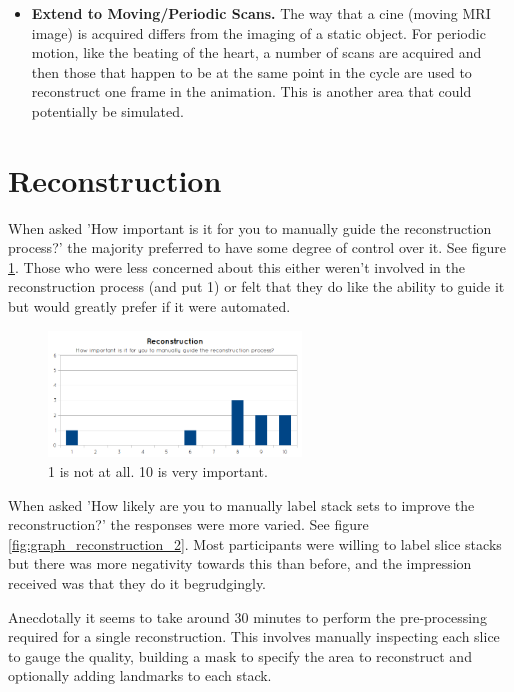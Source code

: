 \begin{itemize}
  \item \textbf{Extend to Moving/Periodic Scans.} The way that a cine (moving MRI image) is acquired differs from the imaging of a static object. For periodic motion, like the beating of the heart, a number of scans are acquired and then those that happen to be at the same point in the cycle are used to reconstruct one frame in the animation. This is another area that could potentially be simulated.
\end{itemize}


\newpage
\section{Reconstruction}\label{results:reconstruction}
When asked 'How important is it for you to manually guide the reconstruction process?' the majority preferred to have some degree of control over it. See figure \ref{fig:graph_reconstruction_1}. Those who were less concerned about this either weren't involved in the reconstruction process (and put 1) or felt that they do like the ability to guide it but would greatly prefer if it were automated.

\begin{figure}[h]
    \centering
  \includegraphics[width=0.6\textwidth]{images/evaluation/graph_reconstruction_1.png}
    \caption{1 is not at all. 10 is very important.}\label{fig:graph_reconstruction_1}
\end{figure}

When asked 'How likely are you to manually label stack sets to improve the reconstruction?' the responses were more varied. See figure \ref{fig:graph_reconstruction_2}. Most participants were willing to label slice stacks but there was more negativity towards this than before, and the impression received was that they do it begrudgingly.

Anecdotally it seems to take around 30 minutes to perform the pre-processing required for a single reconstruction. This involves manually inspecting each slice to gauge the quality, building a mask to specify the area to reconstruct and optionally adding landmarks to each stack.

